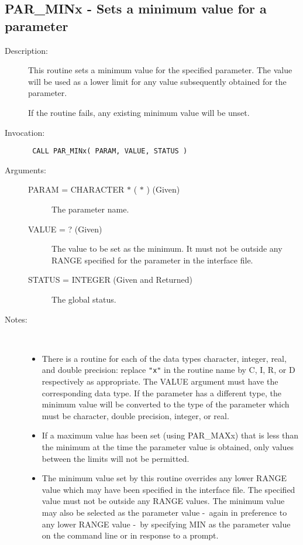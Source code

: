 \documentclass[twoside,11pt]{article}
\newcommand{\xlabel}[1]{}
\newcommand{\dash}{--}
\renewcommand{\dash}{-}
\newlength{\sstbannerlength}
\newlength{\sstcaptionlength}
\newlength{\sstexampleslength}
\newlength{\sstexampleswidth}
\newcommand{\sstroutine}[3]{
   \goodbreak
   \rule{\textwidth}{0.5mm}
   \vspace{-7ex}
   \newline
   \settowidth{\sstbannerlength}{{\Large {\bf #1}}}
   \setlength{\sstcaptionlength}{\textwidth}
   \setlength{\sstexampleslength}{\textwidth}
   \addtolength{\sstbannerlength}{0.5em}
   \addtolength{\sstcaptionlength}{-2.0\sstbannerlength}
   \addtolength{\sstcaptionlength}{-5.0pt}
   \settowidth{\sstexampleswidth}{{\bf Examples:}}
   \addtolength{\sstexampleslength}{-\sstexampleswidth}
   \parbox[t]{\sstbannerlength}{\flushleft{\Large {\bf #1}}}
   \parbox[t]{\sstcaptionlength}{\center{\Large #2}}
   \parbox[t]{\sstbannerlength}{\flushright{\Large {\bf #1}}}
   \begin{description}
      #3
   \end{description}
}
\newcommand{\sstdescription}[1]{\item[Description:] #1}
\newcommand{\sstinvocation}[1]{\item[Invocation:]\hspace{0.4em}{\tt #1}}
\newcommand{\sstarguments}[1]{
   \item[Arguments:] \mbox{} \\
   \vspace{-3.5ex}
   \begin{description}
      #1
   \end{description}
}
\newcommand{\sstsubsection}[1]{ \item[{#1}] \mbox{} \\}
\newcommand{\sstnotes}[1]{\item[Notes:] \mbox{} \\[1.3ex] #1}
\newcommand{\sstitemlist}[1]{
  \mbox{} \\
  \vspace{-7ex}
  \begin{itemize}
     #1
  \end{itemize}
}
\newcommand{\sstitem}{\item}
\newcommand{\ssttt}{\tt}
\renewcommand{\sstroutine}[3]{
      \subsection{\xlabel{12}#1\xlabel{#1}-\label{#1}#2}
      \begin{description}
         #3
      \end{description}
   }
\renewcommand{\sstdescription}[1]{\item[Description:]
      \begin{description}
         #1
      \end{description}
   }
\renewcommand{\sstinvocation}[1]{\item[Invocation:]
      \begin{description}
         {\ssttt #1}
      \end{description}
   }
\renewcommand{\sstarguments}[1]{
      \item[Arguments:]
      \begin{description}
         #1
      \end{description}
   }
\renewcommand{\sstsubsection}[1]{\item[{#1}]}
\renewcommand{\sstnotes}[1]{\item[Notes:]
      \begin{description}
         #1
      \end{description}
   }
\newcommand{\sstitemlist}[1]{
      \begin{itemize}
         #1
      \end{itemize}
   }
\begin{document}
\sstroutine{
   PAR\_MINx
}{
   Sets a minimum value for a parameter
}{
   \sstdescription{
      This routine sets a minimum value for the specified parameter.
      The value will be used as a lower limit for any value
      subsequently obtained for the parameter.

      If the routine fails, any existing minimum value will be unset.
   }
   \sstinvocation{
      CALL PAR\_MINx( PARAM, VALUE, STATUS )
   }
   \sstarguments{
      \sstsubsection{
         PARAM = CHARACTER $*$ ( $*$ ) (Given)
      }{
         The parameter name.
      }
      \sstsubsection{
         VALUE = ? (Given)
      }{
         The value to be set as the minimum. It must not be outside
         any RANGE specified for the parameter in the interface file.
      }
      \sstsubsection{
         STATUS = INTEGER (Given and Returned)
      }{
         The global status.
      }
   }
   \sstnotes{
      \sstitemlist{

         \sstitem
         There is a routine for each of the data types character,
         integer, real, and double precision: replace {\tt "x"} in the routine
         name by C, I, R, or D respectively as appropriate.  The VALUE
         argument must have the corresponding data type.  If the parameter
         has a different type, the minimum value will be converted to the
         type of the parameter which must be character, double precision,
         integer, or real.

         \sstitem
         If a maximum value has been set (using PAR\_MAXx) that is less
         than the minimum at the time the parameter value is obtained,
         only values between the limits will not be permitted.

         \sstitem
         The minimum value set by this routine overrides any lower
          RANGE value which may have been specified in the interface file.
         The specified value must not be outside any RANGE values.  The
         minimum value may also be selected as the parameter value \dash\ again
         in preference to any lower RANGE value \dash\ by specifying MIN as the
         parameter value on the command line or in response to a prompt.
      }
   }
}
\end{document}
